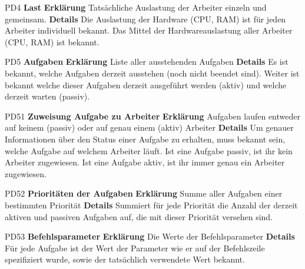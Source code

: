 \documentclass[a4paper,12pt]{article}
\begin{document}
\begin{itemize}[nosep]
\begin{minipage}[t]{\linewidth}
\item[PD4] \textbf{Last}
\subitem \textbf{Erklärung} Tatsächliche Auslastung der Arbeiter einzeln und gemeinsam.
\subitem \textbf{Details} Die Auslastung der Hardware (CPU, RAM) ist für jeden Arbeiter individuell bekannt.\newline
Das Mittel der Hardwareauslastung aller Arbeiter (CPU, RAM) ist bekannt.
\end{minipage}
\vspace{20mm}

\begin{minipage}[t]{\linewidth}
\item[PD5] \textbf{Aufgaben}
\subitem \textbf{Erklärung} Liste aller ausstehenden Aufgaben
\subitem \textbf{Details} Es ist bekannt, welche Aufgaben derzeit ausstehen (noch nicht beendet sind). Weiter ist bekannt welche dieser Aufgaben derzeit ausgeführt werden (aktiv) und welche derzeit warten (passiv).
\end{minipage}
\vspace{20mm}

\begin{minipage}[t]{\linewidth}
\item[PD51] \textbf{Zuweisung Aufgabe zu Arbeiter}
\subitem \textbf{Erklärung} Aufgaben laufen entweder auf keinem (passiv) oder auf genau einem (aktiv) Arbeiter
\subitem \textbf{Details} Um genauer Informationen über den Status einer Aufgabe zu erhalten, muss bekannt sein, welche Aufgabe auf welchem Arbeiter läuft.\newline
Ist eine Aufgabe passiv, ist ihr kein Arbeiter zugewiesen.\newline
Ist eine Aufgabe aktiv, ist ihr immer genau ein Arbeiter zugewiesen.
\end{minipage}
\vspace{20mm}

\begin{minipage}[t]{\linewidth}
\item[PD52] \textbf{Prioritäten der Aufgaben}
\subitem \textbf{Erklärung} Summe aller Aufgaben einer bestimmten Priorität
\subitem \textbf{Details} Summiert für jede Priorität die Anzahl der derzeit aktiven und passiven Aufgaben auf, die mit dieser Priorität versehen sind.
\end{minipage}
\vspace{20mm}

\begin{minipage}[t]{\linewidth}
\item[PD53] \textbf{Befehlsparameter}
\subitem \textbf{Erklärung} Die Werte der Befehlsparameter
\subitem \textbf{Details} Für jede Aufgabe ist der Wert der Parameter wie er auf der Befehlszeile spezifiziert wurde, sowie der tatsächlich verwendete Wert bekannt.
\end{minipage}
\vspace{20mm}


\end{itemize}
\end{document}
